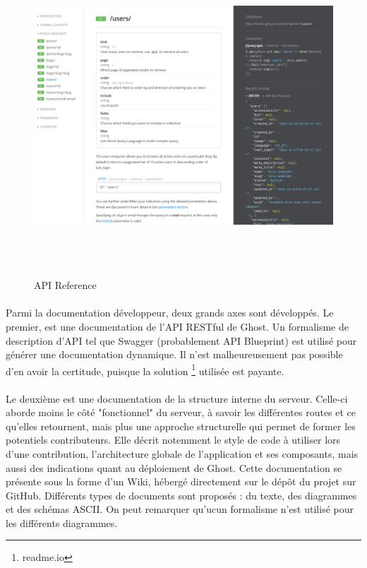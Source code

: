         \newpage
        \begin{figure}[h]
            \centering
            \includegraphics[height=12cm]{./assets/ghost2.png}
            \caption{API Reference}
        \end{figure}
        \paragraph{}
            Parmi la documentation développeur, deux grands axes sont développés.
            Le premier, est une documentation de l'API RESTful de Ghost. Un formalisme de description
            d'API tel que Swagger (probablement API Blueprint) est utilisé pour générer une documentation
            dynamique. Il n'est malheureusement pas possible d'en avoir la certitude, puisque la solution
            \footnote{readme.io} utilisée est payante.



        \newpage
        \paragraph{}
            Le deuxième est une documentation de la structure interne du serveur. Celle-ci aborde moins
            le côté "fonctionnel" du serveur, à savoir les différentes routes et ce qu'elles retournent, mais
            plus une approche structurelle qui permet de former les potentiels contributeurs. Elle
            décrit notemment le style de code à utiliser lors d'une contribution, l'architecture globale
            de l'application et ses composants, mais aussi des indications quant au déploiement de Ghost.
            Cette documentation se présente sous la forme d'un Wiki, hébergé directement sur le
            dépôt du projet sur GitHub. Différents types de documents sont proposés : du texte, des
            diagrammes et des schémas ASCII. On peut remarquer qu'ucun formalisme n'est utilisé
            pour les différents diagrammes.

